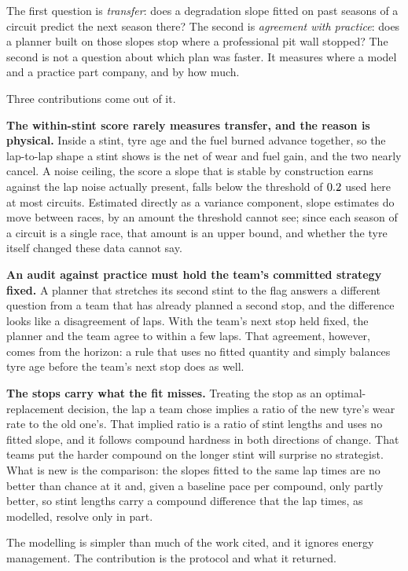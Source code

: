 \documentclass[11pt,a4paper]{article}
\begin{document}
The first question is \emph{transfer}: does a degradation slope fitted on past
seasons of a circuit predict the next season there? The second is
\emph{agreement with practice}: does a planner built on those slopes stop where
a professional pit wall stopped? The second is not a question about which plan
was faster. It measures where a model and a practice part company, and by how
much.

Three contributions come out of it.

\textbf{The within-stint score rarely measures transfer, and the reason is
physical.} Inside a stint, tyre age and the fuel burned advance together, so the
lap-to-lap shape a stint shows is the net of wear and fuel gain, and the two
nearly cancel. A noise ceiling, the score a slope that is stable by construction
earns against the lap noise actually present, falls below the threshold of $0.2{}$ used here at most circuits. Estimated directly as a variance component, slope
estimates do move between races, by an amount the threshold cannot see; since
each season of a circuit is a single race, that amount is an upper bound, and
whether the tyre itself changed these data cannot say.

\textbf{An audit against practice must hold the team's committed strategy
fixed.} A planner that stretches its second stint to the flag answers a
different question from a team that has already planned a second stop, and the
difference looks like a disagreement of \FoneMedian{} laps. With the team's next stop
held fixed, the planner and the team agree to within a few laps. That
agreement, however, comes from the horizon: a rule that
uses no fitted quantity and simply balances tyre age before the team's next stop
does as well.

\textbf{The stops carry what the fit misses.} Treating the stop as an
optimal-replacement decision, the lap a team chose implies a ratio of the new
tyre's wear rate to the old one's. That implied ratio is a ratio of stint
lengths and uses no fitted slope, and it follows compound hardness in both
directions of change. That teams put the harder compound on the longer stint
will surprise no strategist. What is new is the comparison: the slopes fitted
to the same lap times are no better than chance at it and, given a baseline
pace per compound, only partly better, so stint lengths carry a compound
difference that the lap times, as modelled, resolve only in part.

The modelling is simpler than much of the work cited, and it ignores energy
management. The contribution is the protocol and what it returned.
\end{document}
